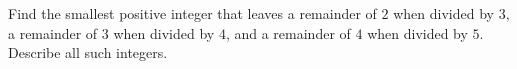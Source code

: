 Find the smallest positive integer that leaves a remainder of $2$ when divided by $3$, a remainder of $3$ when divided by $4$, and a remainder of $4$ when divided by $5$. Describe all such integers.
